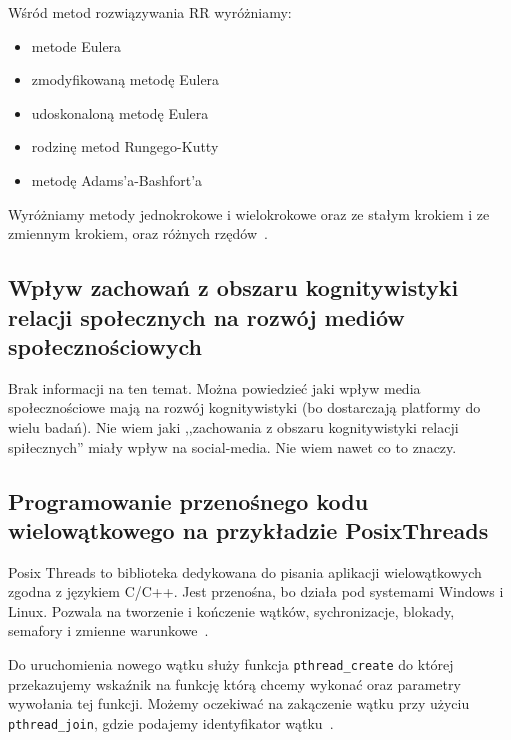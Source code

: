 \documentclass[wi]{zut}
\begin{document}
Wśród metod rozwiązywania RR wyróżniamy:
\begin{itemize}
    \item metode Eulera
    \item zmodyfikowaną metodę Eulera
    \item udoskonaloną metodę Eulera
    \item rodzinę metod Rungego-Kutty
    \item metodę Adams'a-Bashfort'a
\end{itemize}

Wyróżniamy metody jednokrokowe i wielokrokowe oraz ze stałym krokiem i ze zmiennym krokiem, oraz różnych rzędów~\cite{Piela_RR}.

\subsection{Wpływ zachowań z obszaru kognitywistyki relacji społecznych na rozwój mediów społecznościowych}

Brak informacji na ten temat. Można powiedzieć jaki wpływ media społecznościowe mają na rozwój kognitywistyki (bo dostarczają platformy do wielu badań). Nie wiem jaki ,,zachowania z obszaru kognitywistyki relacji spiłecznych'' miały wpływ na social-media. Nie wiem nawet co to znaczy.
\question

\subsection{Programowanie przenośnego kodu wielowątkowego na przykładzie PosixThreads}

Posix Threads to biblioteka dedykowana do pisania aplikacji wielowątkowych zgodna z językiem C/C++. Jest przenośna, bo działa pod systemami Windows i Linux. Pozwala na tworzenie i kończenie wątków, sychronizacje, blokady, semafory i zmienne warunkowe~\cite{Palkowski_POSIX}.

Do uruchomienia nowego wątku służy funkcja \lstinline{pthread_create} do której przekazujemy wskaźnik na funkcję którą chcemy wykonać oraz parametry wywołania tej funkcji. Możemy oczekiwać na zakączenie wątku przy użyciu \lstinline{pthread_join}, gdzie podajemy identyfikator wątku~\cite{Palkowski_POSIX}.
\end{document}
